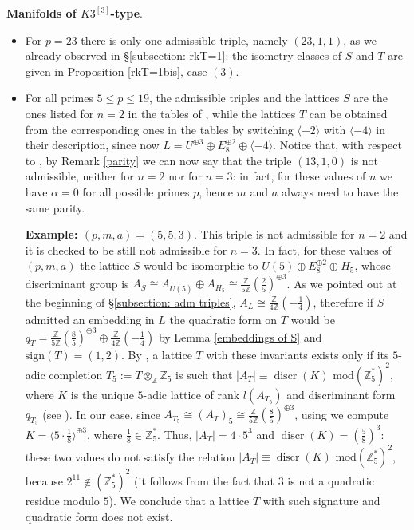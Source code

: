 \documentclass{amsart}
\theoremstyle{definition}
\newcommand{\IZ}{\mathbb{Z}}
\newcommand{\coloneqq}{:=}
\newcommand{\sign}{\mathrm{sign}}
\DeclareMathOperator{\discr}{discr}
\begin{document}
\textbf{Manifolds of $K3^{[3]}$-type}.
\begin{itemize}
\item For $p=23$ there is only one admissible triple, namely $(23,1,1)$, as we already observed in \S \ref{subsection: rkT=1}: the isometry classes of $S$ and $T$ are given in Proposition \ref{rkT=1bis}, case $(3)$.

\item For all primes $5 \leq p \leq 19$, the admissible triples and the lattices $S$ are the ones listed for $n=2$ in the tables of \cite[Appendix A]{bcs}, while the lattices $T$ can be obtained from the corresponding ones in the tables by switching $\langle-2\rangle$ with $\langle-4\rangle$ in their description, since now $L = U^{\oplus 3}\oplus E_8^{\oplus 2} \oplus \langle-4\rangle$. Notice that, with respect to \cite[Table 5]{bcs}, by Remark \ref{parity} we can now say that the triple $(13,1,0)$ is not admissible, neither for $n=2$ nor for $n=3$: in fact, for these values of $n$ we have $\alpha = 0$ for all possible primes $p$, hence $m$ and $a$ always need to have the same parity.

\textbf{Example: $(p,m,a) = (5,5,3)$}. This triple is not admissible for $n=2$ and it is checked to be still not admissible for $n=3$. In fact, for these values of $(p,m,a)$ the lattice $S$ would be isomorphic to $U(5) \oplus E_8^{\oplus 2} \oplus H_5$, whose discriminant group is $A_S \cong A_{U(5)} \oplus A_{H_5} \cong \frac{\IZ}{5 \IZ} \left( \frac{2}{5}\right)^{\oplus 3}$. As we pointed out at the beginning of \S \ref{subsection: adm triples}, $A_L \cong \frac{\IZ}{4 \IZ}\left( -\frac{1}{4}\right)$, therefore if $S$ admitted an embedding in $L$ the quadratic form on $T$ would be \mbox{$q_T = \frac{\IZ}{5 \IZ}\left( \frac{8}{5}\right)^{\oplus 3} \oplus \frac{\IZ}{4 \IZ} \left( -\frac{1}{4}\right)$} by Lemma \ref{embeddings of S} and $\sign(T) = (1,2)$. By \cite[Theorem 1.10.1]{nikulin}, a lattice $T$ with these invariants exists only if its $5$-adic completion $T_5 \coloneqq T \otimes_\IZ \IZ_5$ is such that $\lvert A_T \rvert \equiv \discr(K) \text{ mod} \left( \IZ_5^*\right)^2$, where $K$ is the unique $5$-adic lattice of rank $l(A_{T_5})$ and discriminant form $q_{T_5}$ (see \cite[Theorem 1.9.1]{nikulin}). In our case, since $A_{T_5} \cong \left( A_T\right)_5 \cong \frac{\IZ}{5 \IZ}\left( \frac{8}{5}\right)^{\oplus 3}$, using \cite[Proposition 1.8.1]{nikulin} we compute $K = \langle 5 \cdot \frac{1}{8}\rangle ^{\oplus 3}$, where $\frac{1}{8} \in \IZ_5^*$. Thus, $\lvert A_T \rvert = 4 \cdot 5^3$ and $\discr(K) = \left( \frac{5}{8}\right)^3$: these two values do not satisfy the relation $\lvert A_T \rvert  \equiv \discr(K) \text{ mod} \left( \IZ_5^*\right)^2$, because $2^{11} \notin \left( \IZ_5^*\right)^2$ (it follows from the fact that $3$ is not a quadratic residue modulo $5$). We conclude that a lattice $T$ with such signature and quadratic form does not exist.


\end{itemize}
\end{document}
